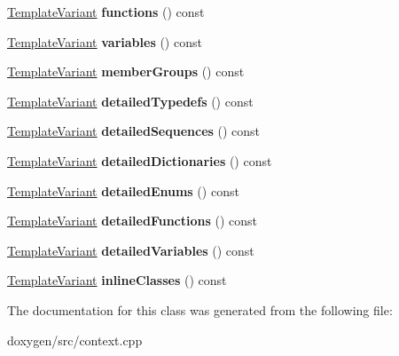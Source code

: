 \begin{DoxyCompactItemize}
\mbox{\hyperlink{class_template_variant}{Template\+Variant}} {\bfseries functions} () const
\item 
\mbox{\label{class_namespace_context_1_1_private_a14ed06c6ab577f8a1c5b8bb180a61322}} 
\mbox{\hyperlink{class_template_variant}{Template\+Variant}} {\bfseries variables} () const
\item 
\mbox{\label{class_namespace_context_1_1_private_af05038318d4d38254bb4eabbce752568}} 
\mbox{\hyperlink{class_template_variant}{Template\+Variant}} {\bfseries member\+Groups} () const
\item 
\mbox{\label{class_namespace_context_1_1_private_a32a843c5d45e9562aa5ab4bc8075491e}} 
\mbox{\hyperlink{class_template_variant}{Template\+Variant}} {\bfseries detailed\+Typedefs} () const
\item 
\mbox{\label{class_namespace_context_1_1_private_a5653554e8d9167ef347fb6b889cc07db}} 
\mbox{\hyperlink{class_template_variant}{Template\+Variant}} {\bfseries detailed\+Sequences} () const
\item 
\mbox{\label{class_namespace_context_1_1_private_ae25cabab298ad98ae8e3c05ec99bc073}} 
\mbox{\hyperlink{class_template_variant}{Template\+Variant}} {\bfseries detailed\+Dictionaries} () const
\item 
\mbox{\label{class_namespace_context_1_1_private_acb047fd41da33df70fc73f54812f5b2b}} 
\mbox{\hyperlink{class_template_variant}{Template\+Variant}} {\bfseries detailed\+Enums} () const
\item 
\mbox{\label{class_namespace_context_1_1_private_a5144089088751624abbef2d9a6211739}} 
\mbox{\hyperlink{class_template_variant}{Template\+Variant}} {\bfseries detailed\+Functions} () const
\item 
\mbox{\label{class_namespace_context_1_1_private_a0572b0d32f8389021aac6b7d51a9e814}} 
\mbox{\hyperlink{class_template_variant}{Template\+Variant}} {\bfseries detailed\+Variables} () const
\item 
\mbox{\label{class_namespace_context_1_1_private_a420acef76a1459cad80e7d16f4d15fd4}} 
\mbox{\hyperlink{class_template_variant}{Template\+Variant}} {\bfseries inline\+Classes} () const
\end{DoxyCompactItemize}


The documentation for this class was generated from the following file\+:\begin{DoxyCompactItemize}
\item 
doxygen/src/context.\+cpp\end{DoxyCompactItemize}
